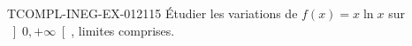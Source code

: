 \begin{exercice}{TCOMPL-INEG-EX-012}{1}{15}
Étudier les variations de $f(x) = x\ln x$ sur $\left]0, +\infty\right[$, limites comprises.

\end{exercice}

